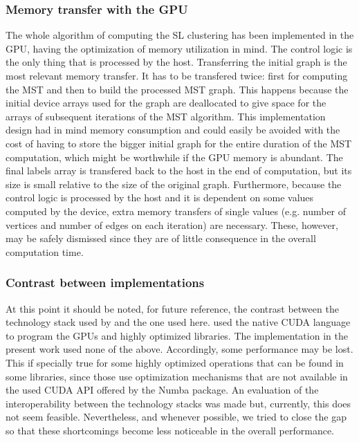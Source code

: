 \subsubsection{Memory transfer with the GPU}
The whole algorithm of computing the SL clustering has been implemented in the GPU, having the optimization of memory utilization in mind.
The control logic is the only thing that is processed by the host. 
Transferring the initial graph is the most relevant memory transfer.
It has to be transfered twice: first for computing the MST and then to build the processed MST graph.
This happens because the initial device arrays used for the graph are deallocated to give space for the arrays of subsequent iterations of the MST algorithm.
This implementation design had in mind memory consumption and could easily be avoided with the cost of having to store the bigger initial graph for the entire duration of the MST computation, which might be worthwhile if the GPU memory is abundant.
The final labels array is transfered back to the host in the end of computation, but its size is small relative to the size of the original graph.
Furthermore, because the control logic is processed by the host and it is dependent on some values computed by the device, extra memory transfers of single values (e.g. number of vertices and number of edges on each iteration) are necessary.
These, however, may be safely dismissed since they are of little consequence in the overall computation time.


\subsubsection{Contrast between implementations}

At this point it should be noted, for future reference, the contrast between the technology stack used by \citet{Sousa2015} and the one used here.
\citet{Sousa2015} used the native CUDA language to program the GPUs and highly optimized libraries.
The implementation in the present work used none of the above.
Accordingly, some performance may be lost.
This if specially true for some highly optimized operations that can be found in some libraries, since those use optimization mechanisms that are not available in the used CUDA API offered by the Numba package.
An evaluation of the interoperability between the technology stacks was made but, currently, this does not seem feasible.
Nevertheless, and whenever possible, we tried to close the gap so that these shortcomings become less noticeable in the overall performance.

